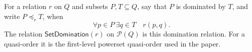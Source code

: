 \begin{definition}
For a relation $r$ on $Q$ and subsets $P,T\subseteq Q$, say that $P$
is dominated by $T$, and write $P\preceq_r T$, when
\[
\forall p\in P\ \exists q\in T\quad r(p,q).
\]
The relation $\mathsf{SetDomination}(r)$ on $\mathcal P(Q)$ is this
domination relation.  For a quasi-order it is the first-level powerset
quasi-order used in the paper.
\end{definition}
